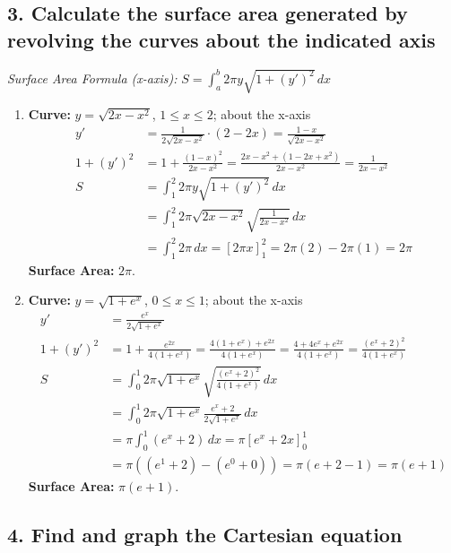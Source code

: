 \documentclass[12pt]{article}
\newcommand{\questiontitle}[1]{\subsection*{#1}}
\begin{document}
\newpage
\questiontitle{3. Calculate the surface area generated by revolving the curves about the indicated axis}

\textit{Surface Area Formula (x-axis):} $S = \displaystyle \int_{a}^{b} 2\pi y \sqrt{1 + (y')^2} \,dx$

\begin{enumerate}[label=\alph*.]
    \item \textbf{Curve:} $y=\sqrt{2x-x^2}$, $1 \le x \le 2$; about the x-axis
    \begin{align*}
        y' &= \frac{1}{2\sqrt{2x-x^2}} \cdot (2-2x) = \frac{1-x}{\sqrt{2x-x^2}} \\
        1+(y')^2 &= 1 + \frac{(1-x)^2}{2x-x^2} = \frac{2x-x^2 + (1-2x+x^2)}{2x-x^2} = \frac{1}{2x-x^2} \\
        S &= \int_{1}^{2} 2\pi y \sqrt{1+(y')^2} \,dx \\
        &= \int_{1}^{2} 2\pi \sqrt{2x-x^2} \sqrt{\frac{1}{2x-x^2}} \,dx \\
        &= \int_{1}^{2} 2\pi \,dx = [2\pi x]_{1}^{2} = 2\pi(2) - 2\pi(1) = 2\pi
    \end{align*}
    \textbf{Surface Area:} $2\pi$.

    \item \textbf{Curve:} $y = \sqrt{1+e^x}$, $0 \le x \le 1$; about the x-axis
    \begin{align*}
        y' &= \frac{e^x}{2\sqrt{1+e^x}} \\
        1+(y')^2 &= 1 + \frac{e^{2x}}{4(1+e^x)} = \frac{4(1+e^x) + e^{2x}}{4(1+e^x)} = \frac{4+4e^x+e^{2x}}{4(1+e^x)} = \frac{(e^x+2)^2}{4(1+e^x)} \\
        S &= \int_{0}^{1} 2\pi \sqrt{1+e^x} \sqrt{\frac{(e^x+2)^2}{4(1+e^x)}} \,dx \\
        &= \int_{0}^{1} 2\pi \sqrt{1+e^x} \frac{e^x+2}{2\sqrt{1+e^x}} \,dx \\
        &= \pi \int_{0}^{1} (e^x+2) \,dx = \pi \left[ e^x+2x \right]_{0}^{1} \\
        &= \pi \left( (e^1+2) - (e^0+0) \right) = \pi(e+2-1) = \pi(e+1)
    \end{align*}
    \textbf{Surface Area:} $\pi(e+1)$.
\end{enumerate}

\newpage
\questiontitle{4. Find and graph the Cartesian equation}
\end{document}

